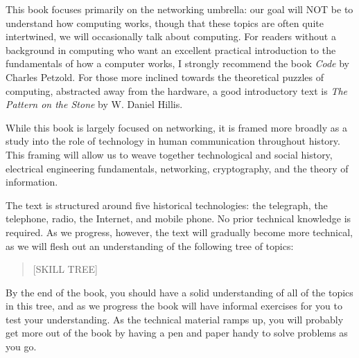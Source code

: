 \documentclass[UTF8]{book}
\begin{document}
\begin{CJK}{UTF8}{gbsn}
This book focuses primarily on the networking umbrella: our goal will NOT be to understand how computing works, though that these topics are often quite intertwined, we will occasionally talk about computing. For readers without a background in computing who want an excellent practical introduction to the fundamentals of how a computer works, I strongly recommend the book \emph{Code} by Charles Petzold. For those more inclined towards the theoretical puzzles of computing, abstracted away from the hardware, a good introductory text is \emph{The Pattern on the Stone} by W. Daniel Hillis.

While this book is largely focused on networking, it is framed more broadly as a study into the role of technology in human communication throughout history. This framing will allow us to weave together technological and social history, electrical engineering fundamentals, networking, cryptography, and the theory of information.

The text is structured around five historical technologies: the telegraph, the telephone, radio, the Internet, and mobile phone. No prior technical knowledge is required. As we progress, however, the text will gradually become more technical, as we will flesh out an understanding of the following tree of topics:

\begin{quotation}
[SKILL TREE]
\end{quotation}

By the end of the book, you should have a solid understanding of all of the topics in this tree, and as we progress the book will have informal exercises for you to test your understanding. As the technical material ramps up, you will probably get more out of the book by having a pen and paper handy to solve problems as you go.

\end{CJK}
\end{document}
